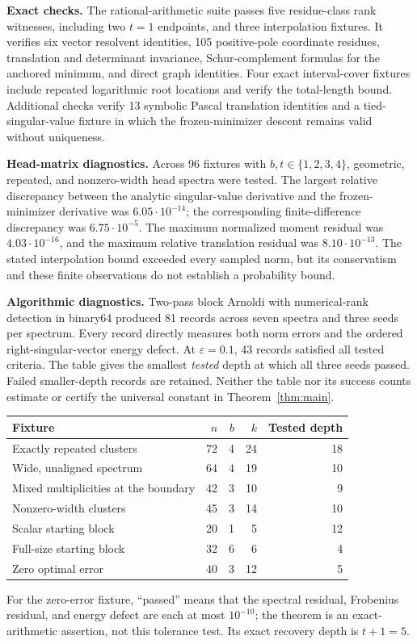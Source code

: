 \textbf{Exact checks.} The rational-arithmetic suite passes five residue-class rank witnesses, including two $t=1$ endpoints, and three interpolation fixtures. It verifies six vector resolvent identities, 105 positive-pole coordinate residues, translation and determinant invariance, Schur-complement formulas for the anchored minimum, and direct graph identities. Four exact interval-cover fixtures include repeated logarithmic root locations and verify the total-length bound. Additional checks verify 13 symbolic Pascal translation identities and a tied-singular-value fixture in which the frozen-minimizer descent remains valid without uniqueness.

\textbf{Head-matrix diagnostics.} Across 96 fixtures with $b,t\in\{1,2,3,4\}$, geometric, repeated, and nonzero-width head spectra were tested. The largest relative discrepancy between the analytic singular-value derivative and the frozen-minimizer derivative was $6.05\cdot10^{-14}$; the corresponding finite-difference discrepancy was $6.75\cdot10^{-5}$. The maximum normalized moment residual was $4.03\cdot10^{-16}$, and the maximum relative translation residual was $8.10\cdot10^{-13}$. The stated interpolation bound exceeded every sampled norm, but its conservatism and these finite observations do not establish a probability bound.

\textbf{Algorithmic diagnostics.} Two-pass block Arnoldi with numerical-rank detection in binary64 produced 81 records across seven spectra and three seeds per spectrum. Every record directly measures both norm errors and the ordered right-singular-vector energy defect. At $\varepsilon=0.1$, 43 records satisfied all tested criteria. The table gives the smallest \emph{tested} depth at which all three seeds passed. Failed smaller-depth records are retained. Neither the table nor its success counts estimate or certify the universal constant in Theorem~\ref{thm:main}.
\begin{center}
\begin{tabular}{lrrrr}
\toprule
Fixture & $n$ & $b$ & $k$ & Tested depth\\
\midrule
Exactly repeated clusters & 72 & 4 & 24 & 18\\
Wide, unaligned spectrum & 64 & 4 & 19 & 10\\
Mixed multiplicities at the boundary & 42 & 3 & 10 & 9\\
Nonzero-width clusters & 45 & 3 & 14 & 10\\
Scalar starting block & 20 & 1 & 5 & 12\\
Full-size starting block & 32 & 6 & 6 & 4\\
Zero optimal error & 40 & 3 & 12 & 5\\
\bottomrule
\end{tabular}
\end{center}
For the zero-error fixture, ``passed'' means that the spectral residual, Frobenius residual, and energy defect are each at most $10^{-10}$; the theorem is an exact-arithmetic assertion, not this tolerance test. Its exact recovery depth is $t+1=5$.


